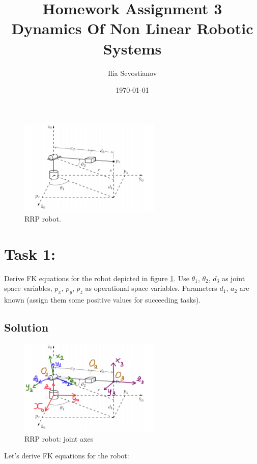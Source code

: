 \documentclass[12pt, a4paper]{report}
\title{%
Homework Assignment 3 
   \\
  \large  Dynamics Of Non Linear Robotic Systems}
\author{Ilia Sevostianov %
    }
\date{\today}
\begin{document}
	\maketitle

\begin{figure}[H]
	\centering
		\includegraphics[width=0.6\textwidth]{Image1} %
	\caption{RRP robot.} %
	\label{fig:mesh1}
\end{figure}

\section*{Task 1:}
Derive FK equations for the robot depicted in figure \ref{fig:mesh1}. Use $\theta_1$, $\theta_2$, $d_3$ as
joint space variables, $p_x$, $p_y$, $p_z$ as operational space variables. Parameters
$d_1$, $a_2$ are known (assign them some positive values for succeeding tasks).

{\centering
\subsection*{Solution}
}

\begin{figure}[H]
	\centering
		\includegraphics[width=0.6\textwidth]{Image2} %
	\caption{RRP robot: joint axes} %
	\label{fig:mesh2}
\end{figure}

Let's derive FK equations for the robot: 
\end{document}
